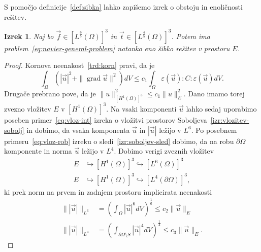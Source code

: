 \documentclass[12pt,a4paper,twoside]{article}
\theoremstyle{definition} %
\theoremstyle{plain} %
\newtheorem{izrek}[definicija]{Izrek}
\numberwithin{equation}{section}
\newcommand{\grad}{\operatorname{grad}}
\newcommand{\eps}{\varepsilon}
\newcommand{\vt}{\vec{t}}
\newcommand{\vu}{\vec{u}}
\newcommand{\vf}{\vec{f}}
\begin{document}
S pomočjo definicije~\ref{def:sibka} lahko zapišemo izrek o obstoju in enoličnosti rešitev.
\begin{izrek}
  \label{izr:enol-obst}
  Naj bo $\vf \in [L^\frac65(\Omega)]^3$ in $\vt \in [L^{\frac45}(\Omega)]^3$.
  Potem ima problem~\ref{eq:navier-general-problem} natanko eno šibko rešitev v
  prostoru $E$.
\end{izrek}
\begin{proof}
Kornova neenakost~\ref{trd:korn} pravi, da je
\begin{equation*}
   \int_{\Omega} (|\vu|^2 + \|\grad \vu\|^2) dV \leq c_1 \int_{\Omega} \eps(\vu):C:\eps(\vu)dV.
\end{equation*}
Drugače prebrano pove, da je $\|u\|_{[H^1(\Omega)]^3}^2 \leq c_1 \|u\|_E^2$. Dano imamo torej
zvezno vložitev $E$ v $[H^1(\Omega)]^3$. Na vsaki komponenti $\vu$ lahko sedaj uporabimo poseben
primer~\eqref{eq:vloz-int} izreka o vložitvi prostorov Soboljeva~\ref{izr:vlozitev-sobolj} in dobimo,
da vsaka komponenta $\vu$ in $|\vu|$ ležijo v $L^6$. Po posebnem primeru~\eqref{eq:vloz-rob} izreku
o sledi~\ref{izr:soboljev-sled} dobimo, da na robu $\partial\Omega$ komponente in norma $\vu$ ležijo
v $L^4$. Dobimo verigi zveznih vložitev
\begin{align*}
  E &\hookrightarrow [H^1(\Omega)]^3 \hookrightarrow [L^6(\Omega)]^3 \\
  E &\hookrightarrow [H^1(\Omega)]^3 \hookrightarrow [L^4(\partial\Omega)]^3,
\end{align*}
ki prek norm na prvem in zadnjem prostoru implicirata neenakosti
\begin{align*}
  \||\vu|\|_{L^6} &= \left( \int_{\Omega} |\vu|^6 dV \right)^\frac16 \leq
  c_2 \|\vu\|_E \\
  \||\vu|\|_{L^4} &= \left( \int_{\partial\Omega\setminus S} |\vu|^4 dV \right)^\frac14 \leq
  c_3 \|\vu\|_E.
\end{align*}


\end{proof}
\end{document}

